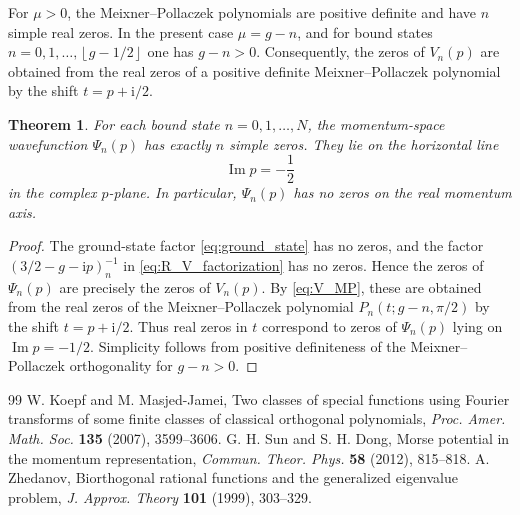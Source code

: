 \documentclass[10pt,a4paper]{amsart}
\newcommand{\ii}{\mathrm{i}}
\newcommand{\floor}[1]{\left\lfloor #1\right\rfloor}
\numberwithin{equation}{section}
\newtheorem{theorem}{Theorem}[section]
\begin{document}
For $\mu>0$, the Meixner--Pollaczek polynomials are positive definite and have $n$ simple real
zeros.  In the present case $\mu=g-n$, and for bound states
$n=0,1,\dots,\floor{g-1/2}$ one has $g-n>0$.
Consequently, the zeros of $V_n(p)$ are obtained from the real zeros of a positive definite
Meixner--Pollaczek polynomial by the shift $t=p+\ii/2$.


\begin{theorem}\label{thm:zeros}
For each bound state $n=0,1,\dots,N$, the momentum-space wavefunction $\Psi_n(p)$ has exactly
$n$ simple zeros.  They lie on the horizontal line
\begin{equation}
  \operatorname{Im}p=-\frac12
\end{equation}
in the complex $p$-plane.  In particular, $\Psi_n(p)$ has no zeros on the real momentum axis.
\end{theorem}

\begin{proof}
The ground-state factor \eqref{eq:ground_state} has no zeros, and the factor
$(3/2-g-\ii p)_n^{-1}$ in \eqref{eq:R_V_factorization} has no zeros.  Hence the zeros of
$\Psi_n(p)$ are precisely the zeros of $V_n(p)$.  By \eqref{eq:V_MP}, these are obtained from the
real zeros of the Meixner--Pollaczek polynomial $P_n(t;g-n,\pi/2)$ by the shift $t=p+\ii/2$.
Thus real zeros in $t$ correspond to zeros of $\Psi_n(p)$ lying on
$\operatorname{Im}p=-1/2$.  Simplicity follows from positive definiteness of the
Meixner--Pollaczek orthogonality for $g-n>0$.
\end{proof}


\begin{thebibliography}{99}
 W. Koepf and M. Masjed-Jamei, Two classes of special functions using Fourier transforms of some finite classes of classical orthogonal polynomials, \emph{Proc. Amer. Math. Soc.} \textbf{135} (2007), 3599--3606.
 G. H. Sun and S. H. Dong, Morse potential in the momentum representation, \emph{Commun. Theor. Phys.} \textbf{58} (2012), 815--818.
 A. Zhedanov, Biorthogonal rational functions and the generalized eigenvalue problem, \emph{J. Approx. Theory} \textbf{101} (1999), 303--329.
\end{thebibliography}
\end{document}
